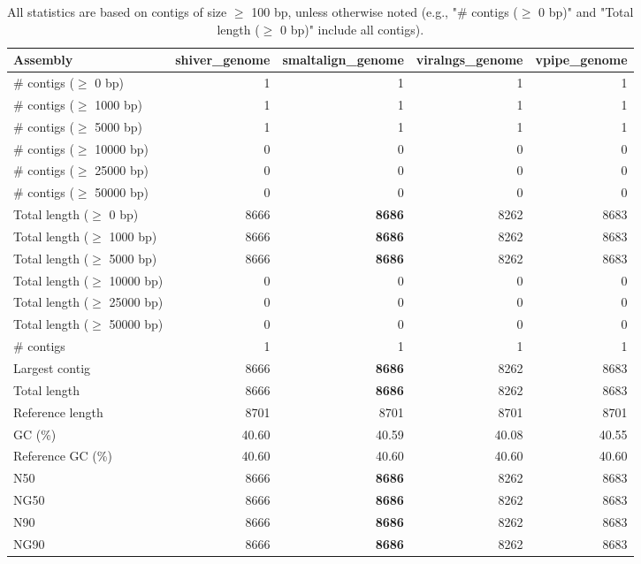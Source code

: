 \documentclass[12pt,a4paper]{article}
\begin{document}
\begin{table}[ht]
\begin{center}
\caption{All statistics are based on contigs of size $\geq$ 100 bp, unless otherwise noted (e.g., "\# contigs ($\geq$ 0 bp)" and "Total length ($\geq$ 0 bp)" include all contigs).}
\begin{tabular}{|l*{4}{|r}|}
\hline
Assembly & shiver\_genome & smaltalign\_genome & viralngs\_genome & vpipe\_genome \\ \hline
\# contigs ($\geq$ 0 bp) & 1 & 1 & 1 & 1 \\ \hline
\# contigs ($\geq$ 1000 bp) & 1 & 1 & 1 & 1 \\ \hline
\# contigs ($\geq$ 5000 bp) & 1 & 1 & 1 & 1 \\ \hline
\# contigs ($\geq$ 10000 bp) & 0 & 0 & 0 & 0 \\ \hline
\# contigs ($\geq$ 25000 bp) & 0 & 0 & 0 & 0 \\ \hline
\# contigs ($\geq$ 50000 bp) & 0 & 0 & 0 & 0 \\ \hline
Total length ($\geq$ 0 bp) & 8666 & {\bf 8686} & 8262 & 8683 \\ \hline
Total length ($\geq$ 1000 bp) & 8666 & {\bf 8686} & 8262 & 8683 \\ \hline
Total length ($\geq$ 5000 bp) & 8666 & {\bf 8686} & 8262 & 8683 \\ \hline
Total length ($\geq$ 10000 bp) & 0 & 0 & 0 & 0 \\ \hline
Total length ($\geq$ 25000 bp) & 0 & 0 & 0 & 0 \\ \hline
Total length ($\geq$ 50000 bp) & 0 & 0 & 0 & 0 \\ \hline
\# contigs & 1 & 1 & 1 & 1 \\ \hline
Largest contig & 8666 & {\bf 8686} & 8262 & 8683 \\ \hline
Total length & 8666 & {\bf 8686} & 8262 & 8683 \\ \hline
Reference length & 8701 & 8701 & 8701 & 8701 \\ \hline
GC (\%) & 40.60 & 40.59 & 40.08 & 40.55 \\ \hline
Reference GC (\%) & 40.60 & 40.60 & 40.60 & 40.60 \\ \hline
N50 & 8666 & {\bf 8686} & 8262 & 8683 \\ \hline
NG50 & 8666 & {\bf 8686} & 8262 & 8683 \\ \hline
N90 & 8666 & {\bf 8686} & 8262 & 8683 \\ \hline
NG90 & 8666 & {\bf 8686} & 8262 & 8683 \\ \hline

\end{tabular}
\end{center}
\end{table}
\end{document}
